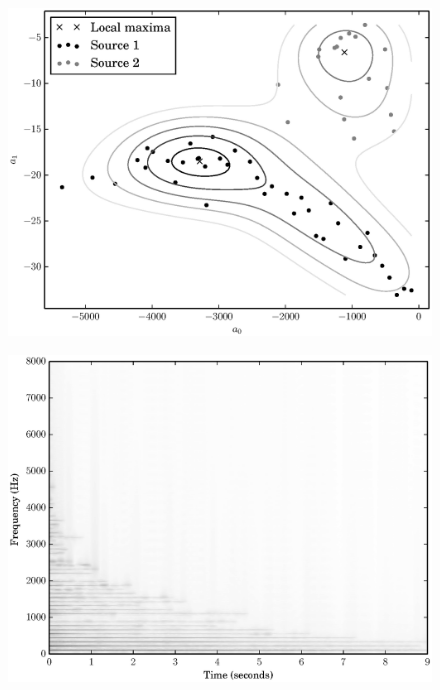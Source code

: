 \begin{figure}[!t]
    \centering
    \includegraphics[width=\figwidthscale\textwidth]{plots/partial_classification_acgtr_xylo_estimated_memberships.eps}
    \CaptionWithTitle{%
    }{\label{plot:partialclassificationacgtrxylosepestimatedmemberships}}
\end{figure}

\begin{figure}[!t]
    \centering
    \includegraphics[width=\figwidthscale\textwidth]{plots/ac_gtr_ss_spec.eps}
    \CaptionWithTitle{%
    }{\label{plot:acgtra3specgramss}}
\end{figure}

